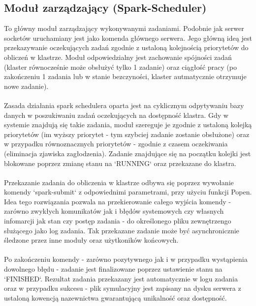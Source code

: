 \documentclass[a4paper,onecolumn,oneside,12pt]{memoir}
\begin{document}
{\subsection{Moduł zarządzający (Spark-Scheduler)}
\quad \quad To główny moduł zarządzający wykonywanymi zadaniami. Podobnie jak serwer socketów
uruchamiany jest jako komenda głównego serwera. Jego główną ideą jest
przekazywanie oczekujących zadań zgodnie z ustaloną kolejnością priorytetów
do obliczeń w klastrze. Moduł odpowiedzialny jest zachowanie spójności zadań
(klaster równocześnie może obsłużyć tylko 1 zadanie) oraz ciągłość pracy
(po zakończeniu 1 zadania lub w stanie bezczyności, klaster autmatycznie otrzymuje
nowe zadanie).\\
\\
Zasada działania spark schedulera oparta jest na cyklicznym odpytywaniu bazy danych
w poszukiwaniu zadań oczekujących na dostępność klastra. Gdy w systemie znajdują się
takie zadania, moduł szereguje je zgodnie z ustaloną kolejką priorytetów (im wyższy
priorytet - tym szybciej zadanie zostanie obsłużone) oraz w przypadku równoznacznych
priorytetów - zgodnie z czasem oczekiwania (eliminacja zjawiska zagłodzenia).
Zadanie znajdujące się na początku kolejki jest blokowane poprzez zmianę stanu
na `RUNNING` oraz przekazane do klastra.\\
\\
Przekazanie zadania do obliczenia w klastrze odbywa się poprzez wywołanie komendy
`spark-submit` z odpowiednimi parametrami, przy użyciu funkcji Popen. Idea tego
rozwiązania pozwala na przekierowanie całego wyjścia komendy - zarówno zwykłych
komunikatów jak i błędów systemowych czy własnych infomarcji jak stan czy postęp
zadania - do określonego pliku zewnętrzengo służącego jako log zadania. Tak przekazane
zadanie może być asynchronicznie śledzone przez inne moduły oraz użytkoników końcowych.\\
\\
Po zakończeniu komendy - zarówno pozytywnego jak i w przypadku wystąpienia dowolnego
błędu - zadanie jest finalizowane poprzez ustawienie stanu na `FINISHED`. Rezultat
zadania przekazany jest automatycznie w logu zadania oraz w przypadku sukcesu -
plik symulacyjny jest zapisany na dysku serwera z ustaloną kowencją nazewnictwa
gwarantującą unikalność oraz dostępność.\\

}
\end{document}
